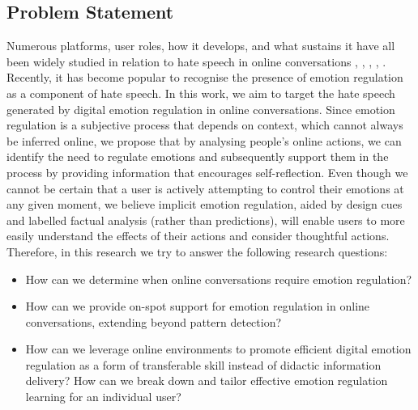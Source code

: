 \documentclass[acmtog]{acmart}
\begin{document}
\subsection{Problem Statement}
Numerous platforms, user roles, how it develops, and what sustains it have all been widely studied in relation to hate speech in online conversations \cite{solovev2022moral}, \cite{saveski2021structure}, \cite{majo2020volume}, \cite{guberman2016quantifying}, \cite{konikoff2021gatekeepers}. Recently, it has become popular to recognise the presence of emotion regulation as a component of hate speech. In this work, we aim to target the hate speech generated by digital emotion regulation in online conversations. Since emotion regulation is a subjective process that depends on context, which cannot always be inferred online, we propose that by analysing people's online actions, we can identify the need to regulate emotions and subsequently support them in the process by providing information that encourages self-reflection. Even though we cannot be certain that a user is actively attempting to control their emotions at any given moment, we believe implicit emotion regulation, aided by design cues and labelled factual analysis (rather than predictions), will enable users to more easily understand the effects of their actions and consider thoughtful actions. Therefore, in this research we try to answer the following research questions:
\begin{itemize}
    \item How can we determine when online conversations require emotion regulation?
    \item How can we provide on-spot support for emotion regulation in online conversations, extending beyond pattern detection?
    \item How can we leverage online environments to promote efficient digital emotion regulation as a form of transferable skill instead of didactic information delivery? How can we break down and tailor effective emotion regulation learning for an individual user?
\end{itemize}



\end{document}
